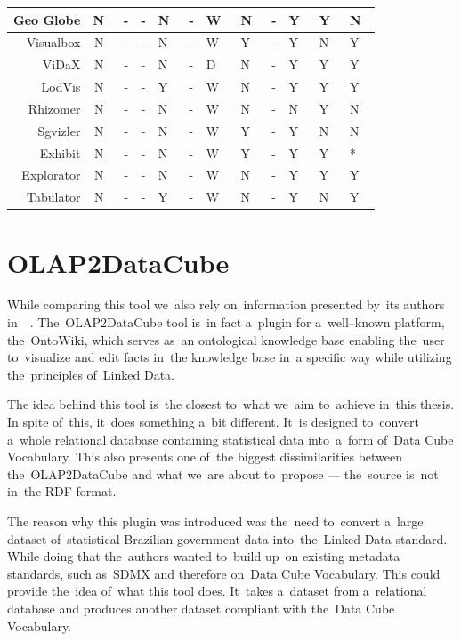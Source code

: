 \begin{tabularx}{\textwidth}{ |r|C|C|C|X|X|X|X|X|X|X|X| }
  Geo Globe             & N~& - & - & N~& - & W~& N~& - & Y~& Y~& N~\\ \hline
  Visualbox              & N~& - & - & N~& - & W~& Y~& - & Y~& N~& Y~\\ \hline
  ViDaX                    & N~& - & - & N~& - & D~& N~& - & Y~& Y~& Y~\\ \hline
  LodVis                   & N~& - & - & Y~& - & W~& N~& - & Y~& Y~& Y~\\ \hline
  Rhizomer              & N~& - & - & N~& - & W~& N~& - & N~& Y~& N~\\ \hline
  Sgvizler                 & N~& - & - & N~& - & W~& Y~& - & Y~& N~& N~\\ \hline
  Exhibit                  & N~& - & - & N~& - & W~& Y~& - & Y~& Y~& * \\ \hline
  Explorator             & N~& - & - & N~& - & W~& N~& - & Y~& Y~& Y~\\ \hline
  Tabulator              & N~& - & - & Y~& - & W~& N~& - & Y~& N~& Y~\\ \hline
\end{tabularx}

\section{OLAP2DataCube}
\label{olap2dc}
\label{rw:olap2dc}
While comparing this tool we~also rely on~information presented by~its authors in~~\cite{olap2dc-paper}. The~OLAP2DataCube tool is~in fact a~plugin for a~well--known 
platform, the~OntoWiki, which serves as~an ontological knowledge base enabling
the~user to~visualize and edit facts in~the knowledge base in~a specific way
while utilizing the~principles of~Linked Data.

The idea behind this tool is~the closest to~what we~aim to~achieve in~this thesis.
In spite of~this, it~does something a~bit different. It~is designed to~convert a~whole relational database containing statistical data into~a~form of~Data Cube 
Vocabulary. This also presents one of~the biggest dissimilarities between the~OLAP2DataCube and 
what we~are about to~propose --- the~source is~not in~the RDF format.

The reason why this plugin was introduced was the~need to~convert a~large 
dataset of~statistical Brazilian government data into~the~Linked Data standard.
While doing that the~authors wanted to~build up~on existing metadata standards, 
such as~SDMX and therefore on~Data Cube Vocabulary. This could provide the~idea of~what this tool does. It~takes a~dataset from a~relational database and produces 
another dataset compliant with the~Data Cube Vocabulary.


